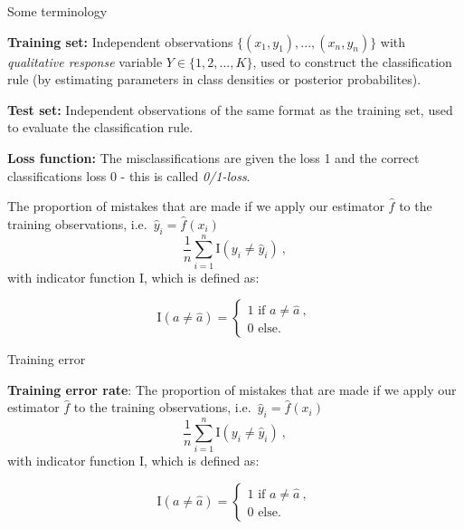\documentclass[
  10pt,
  ignorenonframetext,
]{beamer}
\begin{document}
\begin{frame}{Some terminology}
\protect\hypertarget{some-terminology}{}
\vspace{2mm}

\textbf{Training set:} Independent observations
\(\{(x_1, y_1), ..., (x_n, y_n)\}\) with \emph{qualitative response}
variable \(Y \in \{1, 2, ..., K\}\), used to construct the
classification rule (by estimating parameters in class densities or
posterior probabilites).

\vspace{2mm}

\textbf{Test set:} Independent observations of the same format as the
training set, used to evaluate the classification rule.

\vspace{2mm}

\textbf{Loss function:} The misclassifications are given the loss 1 and
the correct classifications loss 0 - this is called \emph{0/1-loss}.

The proportion of mistakes that are made if we apply our estimator
\(\hat{f}\) to the training observations,
i.e.~\(\hat{y}_i=\hat{f}(x_i)\)
\[\frac{1}{n}\sum_{i=1}^n \text{I}(y_i \neq \hat{y}_i) \ ,\] with
indicator function I, which is defined as:

\[\text{I}(a\neq\hat{a}) = \begin{cases} 1 \text{ if } a \neq \hat{a} \ , \\ 
0 \text{ else. } \end{cases}\]
\end{frame}

\begin{frame}
\begin{block}{Training error}
\protect\hypertarget{training-error}{}
\(~\)

\textbf{Training error rate}: The proportion of mistakes that are made
if we apply our estimator \(\hat{f}\) to the training observations,
i.e.~\(\hat{y}_i=\hat{f}(x_i)\)
\[\frac{1}{n}\sum_{i=1}^n \text{I}(y_i \neq \hat{y}_i) \ ,\] with
indicator function I, which is defined as:

\[\text{I}(a\neq\hat{a}) = \begin{cases} 1 \text{ if } a \neq \hat{a} \ , \\ 
0 \text{ else. } \end{cases}\]

\vspace{2mm}
\end{block}
\end{frame}
\end{document}
